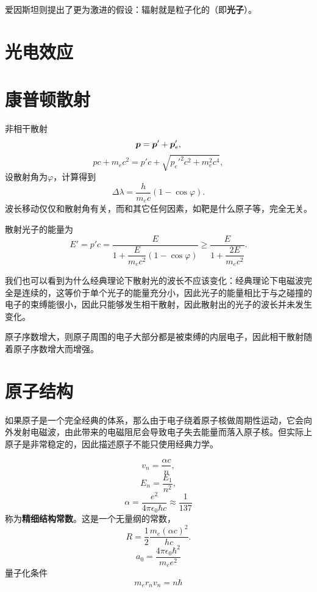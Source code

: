 \documentclass[UTF8, a4paper]{ctexart}
\begin{document}
爱因斯坦则提出了更为激进的假设：辐射就是粒子化的（即\textbf{光子}）。

\section{光电效应}

\section{康普顿散射}

非相干散射
\[
    \vb*{p} = \vb*{p}' + \vb*{p}'_e,
\]
\[
    pc + m_e c^2 = p' c + \sqrt{{p_e'}^2 c^2 + m_e^2 c^4},
\]
设散射角为$\varphi$，计算得到
\begin{equation}
    \Delta \lambda = \frac{h}{m_e c} (1 - \cos \varphi).
\end{equation}
波长移动仅仅和散射角有关，而和其它任何因素，如靶是什么原子等，完全无关。

散射光子的能量为
\begin{equation}
    E' = p'c = \frac{E}{1 + \dfrac{E}{m_e c^2}(1 - \cos \varphi)} \geq \frac{E}{1 + \dfrac{2 E}{m_e c^2}}.
\end{equation}

我们也可以看到为什么经典理论下散射光的波长不应该变化：经典理论下电磁波完全是连续的，这等价于单个光子的能量充分小，因此光子的能量相比于与之碰撞的电子的束缚能很小，因此只能够发生相干散射，因此散射出的光子的波长并未发生变化。

原子序数增大，则原子周围的电子大部分都是被束缚的内层电子，因此相干散射随着原子序数增大而增强。

\section{原子结构}

如果原子是一个完全经典的体系，那么由于电子绕着原子核做周期性运动，它会向外发射电磁波，由此带来的电磁阻尼会导致电子失去能量而落入原子核。但实际上原子是非常稳定的，因此描述原子不能只使用经典力学。

\[
    v_n = \frac{\alpha c}{n},
\]
\[
    E_n = \frac{E_1}{n^2},
\]
\begin{equation}
    \alpha = \frac{e^2}{4\pi \epsilon_0 \hbar c} \approx \frac{1}{137}
\end{equation}
称为\textbf{精细结构常数}。这是一个无量纲的常数，
\[
    R = \frac{1}{2} \frac{m_e (\alpha c)^2}{hc}.
\]
\[
    a_0 = \frac{4\pi\epsilon_0 \hbar^2}{m_e e^2}
\]
量子化条件
\begin{equation}
    m_e r_n v_n = n \hbar
\end{equation}
\end{document}
